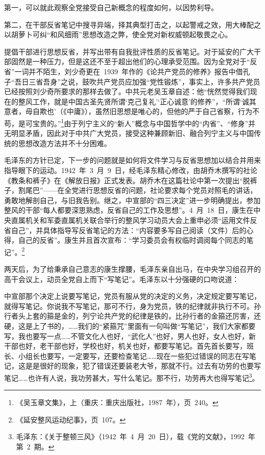 第一，可以就此观察全党接受自己新概念的程度如何，以因势利导。

第二，在干部反省笔记中搜寻异端，择其典型打击之，以起警戒之效，用大棒配之以胡萝卜可纠“和风细雨”思想改造之弊，使全党对新权威顿起敬畏之心。

提倡干部进行思想反省，并写出带有自我批评性质的反省笔记。对于延安的广大干部固然是一种压力，但是这还不至于超出他们的心理承受范围。因为全党对于“反省”一词并不陌生，刘少奇更在~1939~年作的《论共产党员的修养》报告中借孔子“吾日三省吾身”之说，鼓吹共产党员应加强“党性锻炼”，事实上，许多共产党员已经按照刘少奇所要求的那样去做了。中共元老吴玉章自述：他“恍然觉得我们现在的整风工作，就是中国古圣先贤所谓‘克己复礼’‘正心诚意’的修养”，“所谓‘诚其意者，毋自欺也’（《中庸》），虽然旧思想是唯心的，但他的严于自己省察，行为不苟，是可宝贵的。”\footnote{《吴玉章文集》，上（重庆：重庆出版社，1987~年），页~240。}由于列宁主义的“新人”概念与中国哲学中的“内省”、“修身”并无明显矛盾，因此对于中共广大党员，接受这种兼顾新旧、融合列宁主义与中国传统的思想改造方法并不十分困难。

毛泽东的方针已定，下一步的问题就是如何将文件学习与反省思想加以结合并用来指导眼下的运动。1942~年~3~月~9~日，经毛泽东精心修改，由胡乔木撰写的社论《教条和裤子》在《解放日报》正式发表。胡乔木在这篇社论中第一次提出“脱裤子，割尾巴”——在全党进行思想反省的问题，社论要求每个党员对照毛的讲话，勇敢地解剖自己，与旧我告别。继之，中宣部的“四三决定”进一步明确提出，参加整风的干部“每人都要深思熟虑，反省自己的工作及思想”。4~月~18~日，康生在中央直属机关和军委直属机关联合举行的整风学习动员大会上重申必须“运用文件反省自己”，并具体指导写反省笔记的方法：“内容要多写自己阅读（文件）后的心得，自己的反省”。康生并且首次宣布：“学习委员会有权临时调阅每个同志的笔记”。\footnote{《延安整风运动纪事》，页~107。}

两天后，为了给秉承自己意志的康生撑腰，毛泽东亲自出马，在中央学习组召开的高干会议上，动员全党自上而下“写笔记”。毛泽东以十分强硬的口吻说道：

\begin{quoting}
中宣部那个决定上说要写笔记，党员有服从党的决定的义务，决定规定要写笔记，就得写笔记。你说我不写笔记，那可不行，身为党员，铁的纪律就非执行不可。孙行者头上套的箍是金的，列宁论共产党的纪律是铁的，比孙行者的金箍还厉害，还硬，这是上了书的，……我们的“紧箍咒”里面有一句叫做“写笔记”，我们大家都要写，我也要写一点……不管文化人也好，“武化人”也好，男人也好，女人也好，新干部也好，老干部也好，学校也好，机关也好，都要写笔记。首先首长要写，班长、小组长也要写，一定要写，还要检查笔记……现在一些犯过错误的同志在写笔记，这是是很好的现象，犯了错误还要装老大爷，那就不行。过去有功劳的也要写笔记……也许有人说，我功劳甚大，写什么笔记。那不行，功劳再大也得写笔记\footnote{毛泽东：《关于整顿三风》（1942~年~4~月~20~日），载《党的文献》，1992~年第~2~期。}。
\end{quoting}

